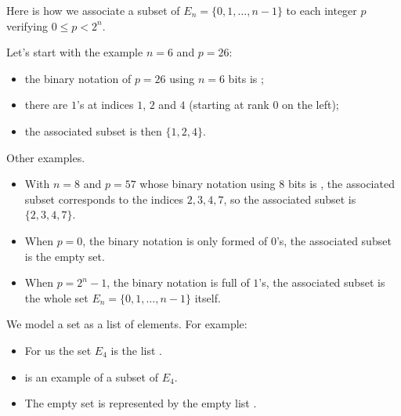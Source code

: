 \documentclass[11pt,class=report,crop=false]{standalone}
\begin{document}
\begin{activite}[Subsets]


Here is how we associate a subset of $E_n = \{0,1,\ldots, n-1\}$ to each integer $p$ verifying $0 \le p < 2^n$.

Let's start with the example $n = 6$ and $p=26$:
\begin{itemize}
  \item the binary notation of $p=26$ using $n=6$ bits is 
  \ci[0,1,1,0,1,0];
  \item there are $1$'s at indices $1$, $2$ and $4$ (starting at rank $0$ on the left);
  \item the associated subset is then $\{1,2,4\}$.
\end{itemize}




\bigskip

Other examples.
\begin{itemize}
  \item With $n = 8$ and $p = 57$ whose binary notation using $8$ bits is \ci{[0,0,1,1,1,0,0,1]}, the associated subset corresponds to the indices $2,3,4,7$, so the associated subset is $\{2,3,4,7\}$.
  
  \smallskip
  

  
  \item When $p=0$, the binary notation is only formed of $0$'s, the associated subset is the empty set.
  \item When $p = 2^n - 1$, the binary notation is full of $1$'s, the associated subset is the whole set $E_n = \{0,1,\ldots, n-1\}$ itself.
\end{itemize}

\bigskip

We model a set as a list of elements.
For example:
\begin{itemize}
  \item For us the set $E_4$ is the list \ci{[0,1,2,3]}.
  \item  \ci{[1,3]} is an example of a subset of $E_4$.
  \item The empty set is represented by the empty list \ci{[]}.
\end{itemize}




\end{activite}
\end{document}
